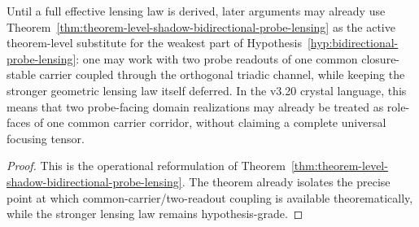 \begin{corollary}
\label{cor:operational-reading-bidirectional-probe-lensing-v320}
Until a full effective lensing law is derived, later arguments may already use Theorem~\ref{thm:theorem-level-shadow-bidirectional-probe-lensing} as the active theorem-level substitute for the weakest part of Hypothesis~\ref{hyp:bidirectional-probe-lensing}: one may work with two probe readouts of one common closure-stable carrier coupled through the orthogonal triadic channel, while keeping the stronger geometric lensing law itself deferred. In the v3.20 crystal language, this means that two probe-facing domain realizations may already be treated as role-faces of one common carrier corridor, without claiming a complete universal focusing tensor.
\end{corollary}

\begin{proof}
This is the operational reformulation of Theorem~\ref{thm:theorem-level-shadow-bidirectional-probe-lensing}. The theorem already isolates the precise point at which common-carrier/two-readout coupling is available theorematically, while the stronger lensing law remains hypothesis-grade.
\end{proof}

